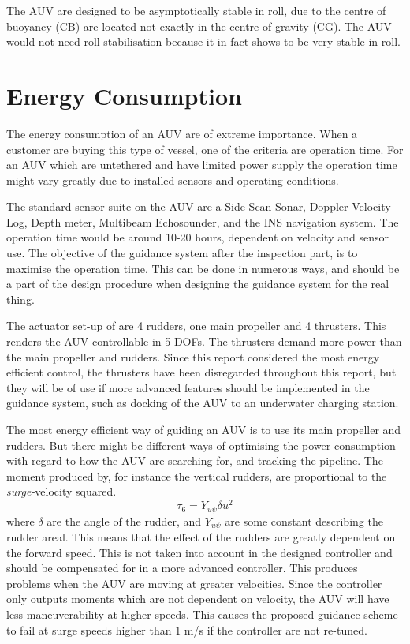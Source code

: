 	The \hugin AUV are designed to be asymptotically stable in roll, due to the centre of buoyancy (CB) are
	located not exactly in the centre of
	gravity (CG). The AUV would not need roll stabilisation because it in fact shows to be very stable in roll.


\section{Energy Consumption}
	The energy consumption of an AUV are of extreme importance. When a customer are buying this type of
	vessel, one of the criteria are operation time. For an AUV which are untethered and have limited power 
	supply the operation time might vary greatly due to installed sensors and operating conditions.

	The standard sensor suite on the \hugin AUV are a Side Scan Sonar, Doppler Velocity Log, Depth meter,
	Multibeam Echosounder, and the INS navigation system. The operation time would be around 10-20 hours,
	dependent on velocity and sensor use. The objective of the guidance system after the inspection
	part, is to maximise the operation time. This can be done in numerous ways, and should be a part of the
	design procedure when designing the guidance system for the real thing.

	The actuator set-up of \hugin  are 4 rudders, one main propeller and 4 thrusters. This renders
	the AUV controllable in 5 DOFs. The thrusters demand more power than the main propeller
	and rudders. Since this report considered the most energy efficient control, the thrusters have been disregarded
	throughout this report, but they will be of use if more advanced features should be implemented in the guidance
	system, such as docking of the AUV to an underwater charging station.

	The most energy efficient way of guiding an AUV is to use its main propeller and rudders. But there
	might be different ways of optimising the power consumption with regard to how the AUV are searching
	for, and tracking the pipeline. The moment produced by, for instance the vertical rudders, are 
	proportional to the \textit{surge-}velocity squared.
		\begin{equation}
			\tau_6 = Y_{u\psi} \delta u^2
		\end{equation}
	where $\delta$ are the angle of the rudder, and $Y_{u \psi}$ are some constant describing the rudder
	areal. This means that the effect of the rudders are greatly dependent on the forward speed. This is
	not taken into account in the designed controller and should be compensated for in a more advanced
	controller. This produces problems when the AUV are moving at greater velocities. Since the
	controller only	outputs moments which are not dependent on velocity, the AUV will have less maneuverability at
	higher speeds. This causes the proposed guidance scheme to fail at surge speeds higher than $1$ m/s if the
	controller are not re-tuned.

